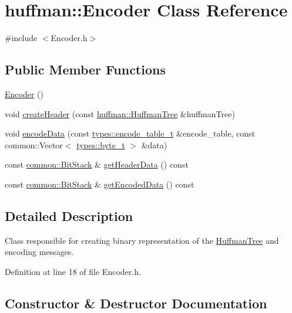 \hypertarget{classhuffman_1_1Encoder}{}\section{huffman\+:\+:Encoder Class Reference}
\label{classhuffman_1_1Encoder}


{\ttfamily \#include $<$Encoder.\+h$>$}

\subsection*{Public Member Functions}
\begin{DoxyCompactItemize}
\item 
\hyperlink{classhuffman_1_1Encoder_a0017a3be4166156c5ba5c6a832338ae6}{Encoder} ()
\item 
void \hyperlink{classhuffman_1_1Encoder_abab95b6dd2ae173ec519ed532ad13cb4}{create\+Header} (const \hyperlink{classhuffman_1_1HuffmanTree}{huffman\+::\+Huffman\+Tree} \&huffman\+Tree)
\item 
void \hyperlink{classhuffman_1_1Encoder_a1c618dc3938974d1c01730bb4b4962e1}{encode\+Data} (const \hyperlink{namespacehuffman_1_1types_a2d111e21190970dfeb935ef0786973c0}{types\+::encode\+\_\+table\+\_\+t} \&encode\+\_\+table, const common\+::\+Vector$<$ \hyperlink{namespacehuffman_1_1types_a198fb2bbef1012ab1696124836c56f0d}{types\+::byte\+\_\+t} $>$ \&data)
\item 
const \hyperlink{classcommon_1_1BitStack}{common\+::\+Bit\+Stack} \& \hyperlink{classhuffman_1_1Encoder_a1f32db20577aca2079a93cacda12a513}{get\+Header\+Data} () const 
\item 
const \hyperlink{classcommon_1_1BitStack}{common\+::\+Bit\+Stack} \& \hyperlink{classhuffman_1_1Encoder_aab3e0873c34ae5e5920043633445ab66}{get\+Encoded\+Data} () const 
\end{DoxyCompactItemize}


\subsection{Detailed Description}
Class responsible for creating binary representation of the \hyperlink{classhuffman_1_1HuffmanTree}{Huffman\+Tree} and encoding messages. 

Definition at line 18 of file Encoder.\+h.



\subsection{Constructor \& Destructor Documentation}
